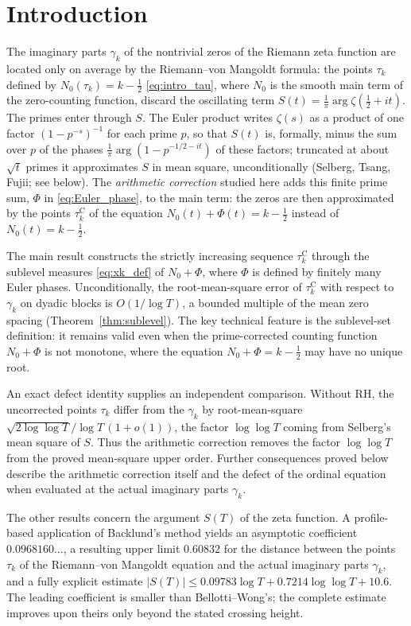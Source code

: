 \documentclass[11pt,a4paper]{article}
\makeatletter
\numberwithin{equation}{section}
\DeclareRobustCommand{\CGref}[1]{\ref{#1}}
\DeclareRobustCommand{\CGeqref}[1]{\eqref{#1}}
\let\CG@origref\ref
\let\CG@origeqref\eqref
\newcommand{\CG@gettip}[1]{\@ifundefined{CGTip@#1}{#1}{\csname CGTip@#1\endcsname}}
\DeclareRobustCommand{\CGref}[1]{\pdftooltip{\CG@origref{#1}}{\CG@gettip{#1}}}
\DeclareRobustCommand{\CGeqref}[1]{\pdftooltip{\CG@origeqref{#1}}{\CG@gettip{#1}}}
\theoremstyle{definition}
\theoremstyle{remark}
\newcommand{\Nz}{N_0} %
\newcommand{\Ph}{\Phi}
\makeatother
\begin{document}
\section{Introduction}\label{sec:intro}
The imaginary parts $\gamma_k$ of the nontrivial zeros of the Riemann zeta function are located only on average by the Riemann--von Mangoldt formula: the points $\tau_k$ defined by $\Nz(\tau_k)=k-\frac12$ \CGeqref{eq:intro_tau}, where $\Nz$ is the smooth main term of the zero-counting function, discard the oscillating term $S(t)=\frac1\pi\arg\zeta(\frac12+it)$. The primes enter through $S$. The Euler product writes $\zeta(s)$ as a product of one factor $(1-p^{-s})^{-1}$ for each prime $p$, so that $S(t)$ is, formally, minus the sum over $p$ of the phases $\frac1\pi\arg(1-p^{-1/2-it})$ of these factors; truncated at about $\sqrt t$ primes it approximates $S$ in mean square, unconditionally (Selberg, Tsang, Fujii; see below). The \emph{arithmetic correction} studied here adds this finite prime sum, $\Ph$ in \CGeqref{eq:Euler_phase}, to the main term: the zeros are then approximated by the points $\tau_k^{\mathrm C}$ of the equation $\Nz(t)+\Ph(t)=k-\frac12$ instead of $\Nz(t)=k-\frac12$.

The main result constructs the strictly increasing sequence $\tau_k^{\mathrm C}$ through the sublevel measures \CGeqref{eq:xk_def} of $\Nz+\Ph$, where $\Ph$ is defined by finitely many Euler phases. Unconditionally, the root-mean-square error of $\tau_k^{\mathrm C}$ with respect to $\gamma_k$ on dyadic blocks is $O(1/\log T)$, a bounded multiple of the mean zero spacing (Theorem~\CGref{thm:sublevel}). The key technical feature is the sublevel-set definition: it remains valid even when the prime-corrected counting function $\Nz+\Ph$ is not monotone, where the equation $\Nz+\Ph=k-\frac12$ may have no unique root.

An exact defect identity supplies an independent comparison. Without RH, the uncorrected points $\tau_k$ differ from the $\gamma_k$ by root-mean-square $\sqrt{2\log\log T}/\log T\,(1+o(1))$, the factor $\log\log T$ coming from Selberg's mean square of $S$. Thus the arithmetic correction removes the factor $\log\log T$ from the proved mean-square upper order. Further consequences proved below describe the arithmetic correction itself and the defect of the ordinal equation when evaluated at the actual imaginary parts $\gamma_k$.

The other results concern the argument $S(T)$ of the zeta function. A profile-based application of Backlund's method yields an asymptotic coefficient $0.0968160\ldots$, a resulting upper limit $0.60832$ for the distance between the points $\tau_k$ of the Riemann--von Mangoldt equation and the actual imaginary parts $\gamma_k$, and a fully explicit estimate $|S(T)|\le0.09783\log T+0.7214\log\log T+10.6$. The leading coefficient is smaller than Bellotti--Wong's; the complete estimate improves upon theirs only beyond the stated crossing height.
\end{document}
